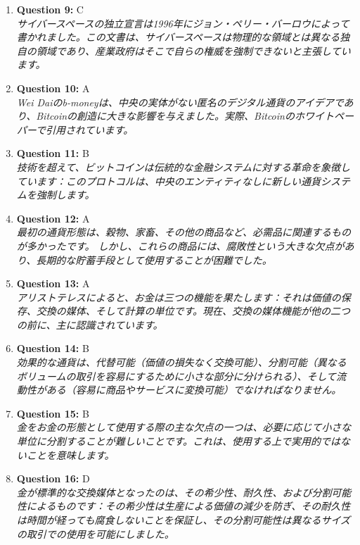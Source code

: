 \documentclass[12pt,a4paper]{article}
\begin{document}
\begin{enumerate}
\item \textbf{Question 9:} C
\\ \textit{サイバースペースの独立宣言は1996年にジョン・ペリー・バーロウによって書かれました。この文書は、サイバースペースは物理的な領域とは異なる独自の領域であり、産業政府はそこで自らの権威を強制できないと主張しています。}

\item \textbf{Question 10:} A
\\ \textit{Wei Daiのb-moneyは、中央の実体がない匿名のデジタル通貨のアイデアであり、Bitcoinの創造に大きな影響を与えました。実際、Bitcoinのホワイトペーパーで引用されています。}

\item \textbf{Question 11:} B
\\ \textit{技術を超えて、ビットコインは伝統的な金融システムに対する革命を象徴しています：このプロトコルは、中央のエンティティなしに新しい通貨システムを強制します。}

\item \textbf{Question 12:} A
\\ \textit{最初の通貨形態は、穀物、家畜、その他の商品など、必需品に関連するものが多かったです。
しかし、これらの商品には、腐敗性という大きな欠点があり、長期的な貯蓄手段として使用することが困難でした。}

\item \textbf{Question 13:} A
\\ \textit{アリストテレスによると、お金は三つの機能を果たします：それは価値の保存、交換の媒体、そして計算の単位です。現在、交換の媒体機能が他の二つの前に、主に認識されています。}

\item \textbf{Question 14:} B
\\ \textit{効果的な通貨は、代替可能（価値の損失なく交換可能）、分割可能（異なるボリュームの取引を容易にするために小さな部分に分けられる）、そして流動性がある（容易に商品やサービスに変換可能）でなければなりません。}

\item \textbf{Question 15:} B
\\ \textit{金をお金の形態として使用する際の主な欠点の一つは、必要に応じて小さな単位に分割することが難しいことです。これは、使用する上で実用的ではないことを意味します。}

\item \textbf{Question 16:} D
\\ \textit{金が標準的な交換媒体となったのは、その希少性、耐久性、および分割可能性によるものです：その希少性は生産による価値の減少を防ぎ、その耐久性は時間が経っても腐食しないことを保証し、その分割可能性は異なるサイズの取引での使用を可能にしました。}


\end{enumerate}
\end{document}
